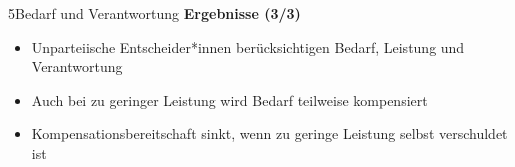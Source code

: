 \documentclass[xcolor=table,9pt,aspectratio=169]{beamer}
\begin{document}
\begin{frame}{\vspace*{10mm}5\hspace*{1em}Bedarf und Verantwortung}
\textbf{Ergebnisse (3/3)}\\
\medskip
\begin{itemize}
   \item Unparteiische Entscheider*innen berücksichtigen Bedarf, Leistung und Verantwortung
   \item Auch bei zu geringer Leistung wird Bedarf teilweise kompensiert
   \item Kompensationsbereitschaft sinkt, wenn zu geringe Leistung selbst verschuldet ist
\end{itemize}
\end{frame}
\end{document}
